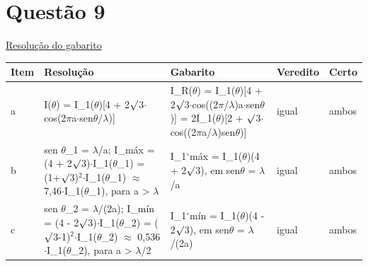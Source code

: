 \documentclass{article}%
\begin{document}
\section*{Questão 9}%
\href{https://poliedroresolve.sistemapoliedro.com.br/vestibulares/ime/2026/ime-2-fase-dia-2-24-10-2025-2-fase-dia-2/dissertativa-9-fisica-2-fase-dia-2-ime-2026}{Resolução do gabarito}\par\smallskip%
\begin{longtable}{@{}p{} p{} p{} p{} p{}@{}}\toprule Item & Resolução & Gabarito & Veredito & Certo \\ \midrule
a & I($\theta$) = I\_1($\theta$){[}4 + 2$\surd$3$\cdot$cos(2$\pi$a$\cdot$sen$\theta$/$\lambda$){]} & I\_R($\theta$) = I\_1($\theta$){[}4 + 2$\surd$3$\cdot$cos((2$\pi$/$\lambda$)a$\cdot$sen$\theta$){]} = 2I\_1($\theta$){[}2 + $\surd$3$\cdot$cos((2$\pi$a/$\lambda$)sen$\theta$){]} & igual & ambos \\
b & sen $\theta$\_1 = $\lambda$/a; I\_máx = (4 + 2$\surd$3)$\cdot$I\_1($\theta$\_1) = (1+$\surd$3)$^2$$\cdot$I\_1($\theta$\_1) $\approx$ 7,46$\cdot$I\_1($\theta$\_1), para a > $\lambda$ & I\_1$^\circ$máx = I\_1($\theta$)(4 + 2$\surd$3), em sen$\theta$ = $\lambda$/a & igual & ambos \\
c & sen $\theta$\_2 = $\lambda$/(2a); I\_mín = (4 - 2$\surd$3)$\cdot$I\_1($\theta$\_2) = ($\surd$3-1)$^2$$\cdot$I\_1($\theta$\_2) $\approx$ 0,536$\cdot$I\_1($\theta$\_2), para a > $\lambda$/2 & I\_1$^\circ$mín = I\_1($\theta$)(4 - 2$\surd$3), em sen$\theta$ = $\lambda$/(2a) & igual & ambos \\
\bottomrule\end{longtable}%
\end{document}
